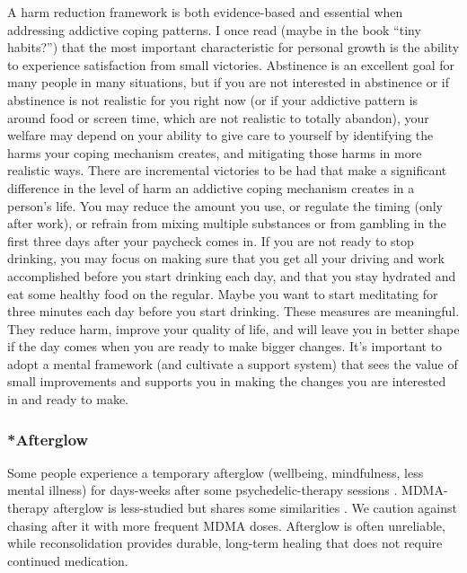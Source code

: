 \documentclass[12pt,letterpaper]{article}
\begin{document}
A harm reduction framework is both evidence-based and essential when addressing addictive coping patterns. I once read (maybe in the book “tiny habits?”) that the most important characteristic for personal growth is the ability to experience satisfaction from small victories. Abstinence is an excellent goal for many people in many situations, but if you are not interested in abstinence or if abstinence is not realistic for you right now (or if your addictive pattern is around food or screen time, which are not realistic to totally abandon), your welfare may depend on your ability to give care to yourself by identifying the harms your coping mechanism creates, and mitigating those harms in more realistic ways. There are incremental victories to be had that make a significant difference in the level of harm an addictive coping mechanism creates in a person's life. You may reduce the amount you use, or regulate the timing (only after work), or refrain from mixing multiple substances or from gambling in the first three days after your paycheck comes in. If you are not ready to stop drinking, you may focus on making sure that you get all your driving and work accomplished before you start drinking each day, and that you stay hydrated and eat some healthy food on the regular. Maybe you want to start meditating for three minutes each day before you start drinking. These measures are meaningful. They reduce harm, improve your quality of life, and will leave you in better shape if the day comes when you are ready to make bigger changes. It's important to adopt a mental framework (and cultivate a support system) that sees the value of small improvements and supports you in making the changes you are interested in and ready to make.
\subsubsection{*Afterglow}
Some people experience a temporary afterglow (wellbeing, mindfulness, less mental illness) for days-weeks after some psychedelic-therapy sessions \cite{evansAfterglow}. MDMA-therapy afterglow is less-studied but shares some similarities \cite{sessaAfterglow}. We caution against chasing after it with more frequent MDMA doses. Afterglow is often unreliable, while reconsolidation provides durable, long-term healing that does not require continued medication.
\end{document}
